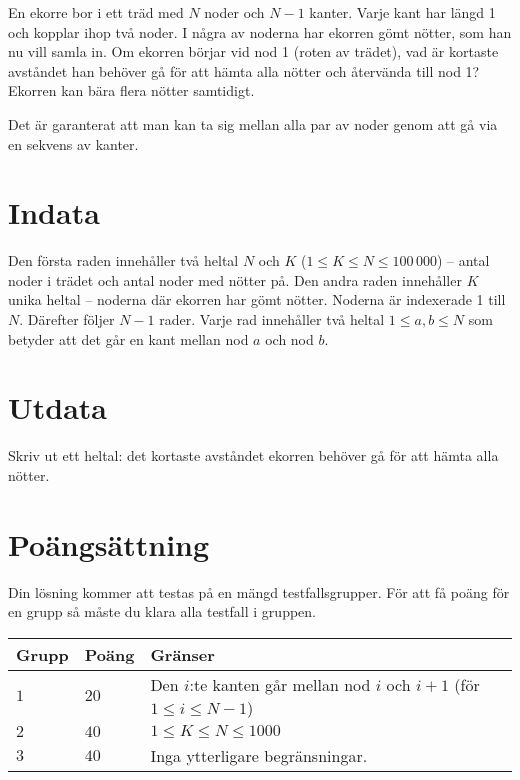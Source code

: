 
En ekorre bor i ett träd med $N$ noder och $N-1$ kanter.
Varje kant har längd 1 och kopplar ihop två noder.
I några av noderna har ekorren gömt nötter, som han nu vill samla in.
Om ekorren börjar vid nod 1 (roten av trädet),
vad är kortaste avståndet han behöver gå för att hämta alla nötter och återvända till nod 1? Ekorren kan bära flera nötter samtidigt.

Det är garanterat att man kan ta sig mellan alla par av noder genom att gå via en sekvens av kanter.


\section*{Indata}
Den första raden innehåller två heltal $N$ och $K$ ($1 \le K\le N \le 100\,000$) -- antal noder i trädet och antal noder med nötter på.
Den andra raden innehåller $K$ unika heltal -- noderna där ekorren har gömt nötter. Noderna är indexerade 1 till $N$.
Därefter följer $N-1$ rader. Varje rad innehåller två heltal $1 \le a,b \le N$ som betyder att det går en kant mellan nod $a$ och nod $b$.

\section*{Utdata}
Skriv ut ett heltal: det kortaste avståndet ekorren behöver gå för att hämta alla nötter.

\section*{Poängsättning}
Din lösning kommer att testas på en mängd testfallsgrupper.
För att få poäng för en grupp så måste du klara alla testfall i gruppen.

\noindent
\begin{tabular}{| l | l | l |}
  \hline
  \textbf{Grupp} & \textbf{Poäng} & \textbf{Gränser} \\ \hline
  $1$    & $20$        &  Den $i$:te kanten går mellan nod $i$ och $i+1$ (för $1\le i \le N-1$) \\ \hline 
  $2$    & $40$        &  $1 \le K \le N \le 1000$ \\ \hline
  $3$    & $40$        &  Inga ytterligare begränsningar. \\ \hline
\end{tabular}
